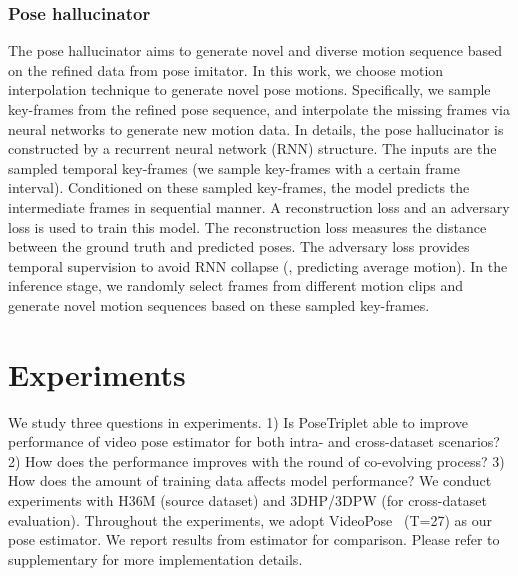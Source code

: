 \documentclass[10pt,twocolumn,letterpaper]{article}
\newcommand{\nameofmethod}{PoseTriplet}
\begin{document}
\subsubsection{Pose hallucinator}
The pose hallucinator aims to generate novel and diverse motion sequence based on the refined data from pose imitator. 
In this work, we choose motion interpolation technique to generate novel pose motions. Specifically, we sample key-frames from the refined pose sequence, and interpolate the missing frames via neural networks to generate new motion data.
In details, the pose hallucinator is constructed by a recurrent neural network (RNN) structure. The inputs are the sampled temporal key-frames (we sample key-frames with a certain frame interval).
Conditioned on these sampled key-frames, the model predicts the intermediate frames in sequential manner.
A reconstruction loss and an adversary loss is used to train this model.
The reconstruction loss measures the  distance between the ground truth and predicted poses. The adversary loss provides temporal supervision to avoid RNN collapse (\ie, predicting average motion).
In the inference stage, we randomly select frames from different motion clips and generate novel motion sequences based on these sampled key-frames.





















 \section{Experiments}


We study three questions in experiments.
1)  Is \nameofmethod{} able to improve performance of video pose estimator for both intra- and  cross-dataset scenarios?
2) How does the performance improves with the round of co-evolving process?
3) How does the amount of training data affects model performance?
We conduct experiments with H36M (source dataset) and 3DHP/3DPW (for cross-dataset evaluation). 
Throughout the experiments, we adopt VideoPose~\cite{pavllo2019videopose3d} (T=27) as our pose estimator. We report results from estimator for comparison. Please refer to supplementary for more implementation details.
\end{document}

